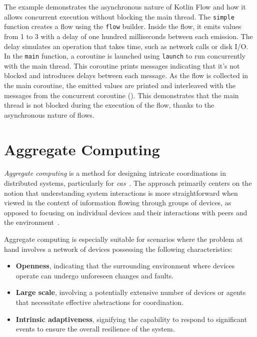 The example  demonstrates the asynchronous nature of Kotlin Flow and how it allows concurrent execution without blocking the main thread. The \texttt{simple} function creates a flow using the \texttt{flow} builder. Inside the flow, it emits values from 1 to 3 with a delay of one hundred milliseconds between each emission. The delay simulates an operation that takes time, such as network calls or disk I/O. In the \texttt{main} function, a coroutine is launched using \texttt{launch} to run concurrently with the main thread. This coroutine prints messages indicating that it's not blocked and introduces delays between each message. As the flow is collected in the main coroutine, the emitted values are printed and interleaved with the messages from the concurrent coroutine (). This demonstrates that the main thread is not blocked during the execution of the flow, thanks to the asynchronous nature of flows.

\section{Aggregate Computing}
\label{section:aggregate-computing}

\textit{Aggregate computing} is a method for designing intricate coordinations in distributed systems, particularly for \textit{\ac{cas}}~\cite{Ferscha2015}. The approach primarily centers on the notion that understanding system interactions is more straightforward when viewed in the context of information flowing through groups of devices, as opposed to focusing on individual devices and their interactions with peers and the environment~\cite{Viroli2019}.

Aggregate computing is especially suitable for scenarios where the problem at hand involves a network of devices possessing the following characteristics:

\begin{itemize}
    \item \textbf{Openness}, indicating that the surrounding environment where devices operate can undergo unforeseen changes and faults.
    \item \textbf{Large scale}, involving a potentially extensive number of devices or agents that necessitate effective abstractions for coordination.
    \item \textbf{Intrinsic adaptiveness}, signifying the capability to respond to significant events to ensure the overall resilience of the system.
\end{itemize}

